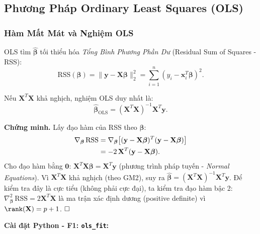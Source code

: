 ﻿\subsection{Phương Pháp Ordinary Least Squares (OLS)}


\subsubsection{Hàm Mất Mát và Nghiệm OLS}

OLS tìm $\hat{\boldsymbol{\beta}}$ tối thiểu hóa \emph{Tổng Bình Phương Phần
Dư} (Residual Sum of Squares - RSS):
\begin{equation}
    \mathrm{RSS}(\boldsymbol{\beta})
    = \|\mathbf{y} - \mathbf{X}\boldsymbol{\beta}\|_2^2
    = \sum_{i=1}^n (y_i - \mathbf{x}_i^T\boldsymbol{\beta})^2.
    \label{eq:rss}
\end{equation}

\begin{tcolorbox}[mycodebox, colback=blue!3!white, colframe=blue!40!black,
    title={\textbf{Định lý 1.1} - Nghiệm OLS (Normal Equations)}]
Nếu $\mathbf{X}^T\mathbf{X}$ khả nghịch, nghiệm OLS duy nhất là:
\begin{equation}
    \hat{\boldsymbol{\beta}}_{\mathrm{OLS}}
    = (\mathbf{X}^T\mathbf{X})^{-1}\mathbf{X}^T\mathbf{y}.
    \label{eq:ols_solution}
\end{equation}
\end{tcolorbox}

\textbf{Chứng minh.} Lấy đạo hàm của RSS theo $\boldsymbol{\beta}$:
\begin{align}
    \nabla_{\boldsymbol{\beta}}\,\mathrm{RSS}
    &= \nabla_{\boldsymbol{\beta}}
       \bigl[(\mathbf{y} - \mathbf{X}\boldsymbol{\beta})^T
             (\mathbf{y} - \mathbf{X}\boldsymbol{\beta})\bigr] \notag \\
    &= -2\,\mathbf{X}^T(\mathbf{y} - \mathbf{X}\boldsymbol{\beta}).
\end{align}
Cho đạo hàm bằng $\mathbf{0}$:
$\mathbf{X}^T\mathbf{X}\boldsymbol{\beta} = \mathbf{X}^T\mathbf{y}$
(phương trình pháp tuyến - \emph{Normal Equations}).
Vì $\mathbf{X}^T\mathbf{X}$ khả nghịch (theo GM2), suy ra
$\hat{\boldsymbol{\beta}} = (\mathbf{X}^T\mathbf{X})^{-1}\mathbf{X}^T\mathbf{y}$.
Để kiểm tra đây là cực tiểu (không phải cực đại), ta kiểm tra đạo hàm bậc 2:
$\nabla^2_{\boldsymbol{\beta}}\,\mathrm{RSS} = 2\mathbf{X}^T\mathbf{X}$
là ma trận xác định dương (positive definite) vì $\rank(\mathbf{X}) = p+1$.
$\hfill\square$

\textbf{Cài đặt Python - F1: \texttt{ols\_fit}:}

